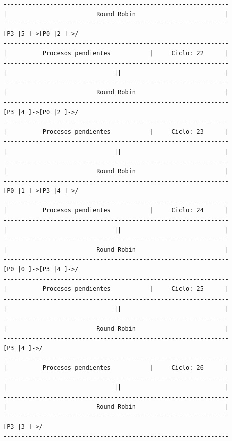 \documentclass[12pt]{article}
\begin{document}
\begin{verbatim}
---------------------------------------------------------------
|                         Round Robin                         |
---------------------------------------------------------------
[P3 |5 ]->[P0 |2 ]->/
---------------------------------------------------------------
|          Procesos pendientes           |     Ciclo: 22      |
---------------------------------------------------------------
|                              ||                             |
---------------------------------------------------------------
|                         Round Robin                         |
---------------------------------------------------------------
[P3 |4 ]->[P0 |2 ]->/
---------------------------------------------------------------
|          Procesos pendientes           |     Ciclo: 23      |
---------------------------------------------------------------
|                              ||                             |
---------------------------------------------------------------
|                         Round Robin                         |
---------------------------------------------------------------
[P0 |1 ]->[P3 |4 ]->/
---------------------------------------------------------------
|          Procesos pendientes           |     Ciclo: 24      |
---------------------------------------------------------------
|                              ||                             |
---------------------------------------------------------------
|                         Round Robin                         |
---------------------------------------------------------------
[P0 |0 ]->[P3 |4 ]->/
---------------------------------------------------------------
|          Procesos pendientes           |     Ciclo: 25      |
---------------------------------------------------------------
|                              ||                             |
---------------------------------------------------------------
|                         Round Robin                         |
---------------------------------------------------------------
[P3 |4 ]->/
---------------------------------------------------------------
|          Procesos pendientes           |     Ciclo: 26      |
---------------------------------------------------------------
|                              ||                             |
---------------------------------------------------------------
|                         Round Robin                         |
---------------------------------------------------------------
[P3 |3 ]->/
---------------------------------------------------------------

\end{verbatim}
\end{document}
